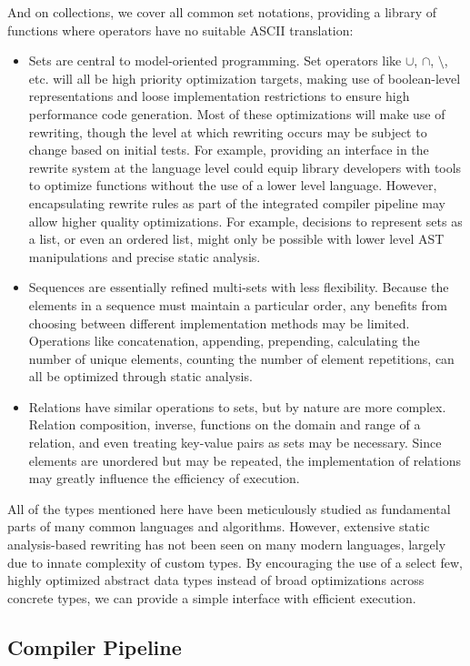 \documentclass{article}
\begin{document}
And on collections, we cover all common set notations, providing a library of functions where operators have no suitable ASCII translation:
\begin{itemize}
  \item Sets are central to model-oriented programming. Set operators like $\cup$, $\cap$, $\setminus$, etc. will all be high priority optimization targets, making use of boolean-level representations and loose implementation restrictions to ensure high performance code generation. Most of these optimizations will make use of rewriting, though the level at which rewriting occurs may be subject to change based on initial tests. For example, providing an interface in the rewrite system at the language level could equip library developers with tools to optimize functions without the use of a lower level language. However, encapsulating rewrite rules as part of the integrated compiler pipeline may allow higher quality optimizations. For example, decisions to represent sets as a list, or even an ordered list, might only be possible with lower level AST manipulations and precise static analysis.
  \item Sequences are essentially refined multi-sets with less flexibility. Because the elements in a sequence must maintain a particular order, any benefits from choosing between different implementation methods may be limited. Operations like concatenation, appending, prepending, calculating the number of unique elements, counting the number of element repetitions, can all be optimized through static analysis.
  \item Relations have similar operations to sets, but by nature are more complex. Relation composition, inverse, functions on the domain and range of a relation, and even treating key-value pairs as sets may be necessary. Since elements are unordered but may be repeated, the implementation of relations may greatly influence the efficiency of execution.
\end{itemize}

All of the types mentioned here have been meticulously studied as fundamental parts of many common languages and algorithms. However, extensive static analysis-based rewriting has not been seen on many modern languages, largely due to innate complexity of custom types. By encouraging the use of a select few, highly optimized abstract data types instead of broad optimizations across concrete types, we can provide a simple interface with efficient execution.

\subsection{Compiler Pipeline}
\end{document}
